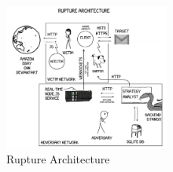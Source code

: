    \begin{figure}[thpb]
      \centering
          \includegraphics[width=0.48\textwidth]{figures/architecture.png}
      \caption{Rupture Architecture}
   \end{figure}
